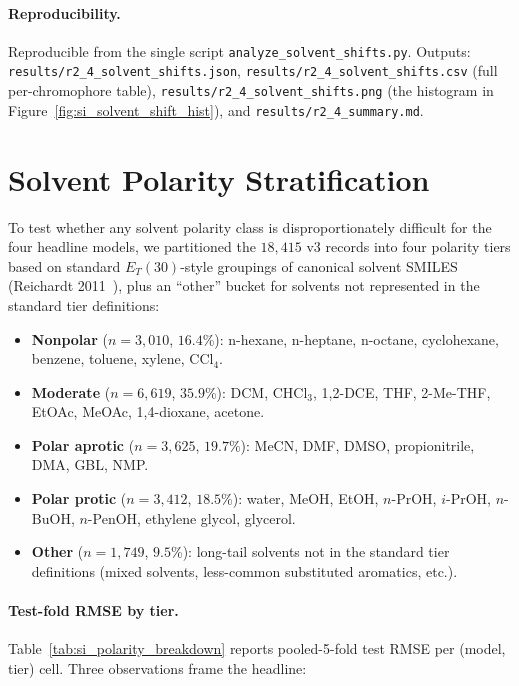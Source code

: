 \documentclass[journal=jcisd8,manuscript=suppinfo]{achemso}
\begin{document}
\paragraph{Reproducibility.}
Reproducible from the single script \texttt{analyze\_solvent\_shifts.py}. Outputs: \texttt{results/r2\_4\_solvent\_shifts.json}, \texttt{results/r2\_4\_solvent\_shifts.csv} (full per-chromophore table), \texttt{results/r2\_4\_solvent\_shifts.png} (the histogram in Figure~\ref{fig:si_solvent_shift_hist}), and \texttt{results/r2\_4\_summary.md}.


\section{Solvent Polarity Stratification}
\label{si:polarity_breakdown}

To test whether any solvent polarity class is disproportionately difficult for the four headline models, we partitioned the $18{,}415$ v3 records into four polarity tiers based on standard $E_T(30)$-style groupings of canonical solvent SMILES (Reichardt 2011~\cite{reichardt2011solvents}), plus an ``other'' bucket for solvents not represented in the standard tier definitions:
\begin{itemize}[leftmargin=2em,itemsep=2pt]
 \item \textbf{Nonpolar} ($n = 3{,}010$, $16.4$\%): n-hexane, n-heptane, n-octane, cyclohexane, benzene, toluene, xylene, CCl$_4$.
 \item \textbf{Moderate} ($n = 6{,}619$, $35.9$\%): DCM, CHCl$_3$, 1,2-DCE, THF, 2-Me-THF, EtOAc, MeOAc, 1,4-dioxane, acetone.
 \item \textbf{Polar aprotic} ($n = 3{,}625$, $19.7$\%): MeCN, DMF, DMSO, propionitrile, DMA, GBL, NMP.
 \item \textbf{Polar protic} ($n = 3{,}412$, $18.5$\%): water, MeOH, EtOH, $n$-PrOH, $i$-PrOH, $n$-BuOH, $n$-PenOH, ethylene glycol, glycerol.
 \item \textbf{Other} ($n = 1{,}749$, $9.5$\%): long-tail solvents not in the standard tier definitions (mixed solvents, less-common substituted aromatics, etc.).
\end{itemize}

\paragraph{Test-fold RMSE by tier.}
Table~\ref{tab:si_polarity_breakdown} reports pooled-5-fold test RMSE per (model, tier) cell. Three observations frame the headline:
\end{document}

